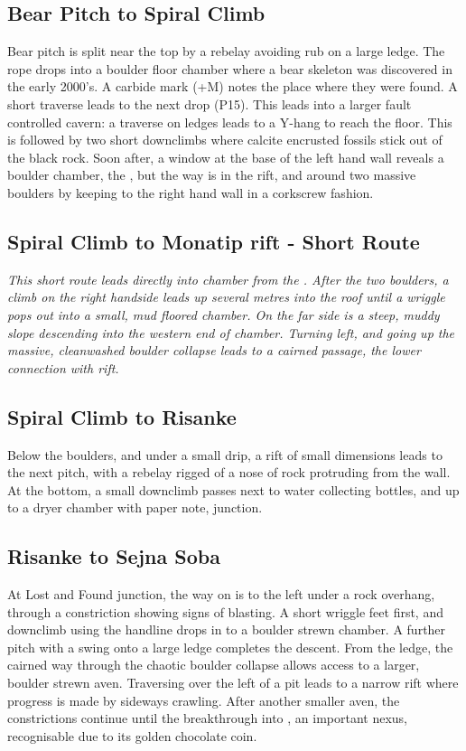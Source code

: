\subsection{Bear Pitch to Spiral Climb}
Bear pitch is split near the top by a rebelay avoiding rub on a large ledge. The rope drops into a boulder floor chamber where a bear skeleton was discovered in the early 2000's. A carbide mark (+M) notes the place where they were found. A short traverse leads to the next drop (P15). This leads into a larger fault controlled cavern: a traverse on ledges leads to a Y-hang to reach the floor. This is followed by two short downclimbs where calcite encrusted fossils stick out of the black rock. Soon after, a window at the base of the left hand wall reveals a boulder chamber, the , but the way is in the rift, and around two massive boulders by keeping to the right hand wall in a corkscrew fashion. 

\subsection{Spiral Climb to Monatip rift - Short Route}
\textit{This short route leads directly into  chamber from the . After the two boulders, a climb on the right handside leads up several metres into the roof until a wriggle pops out into a small, mud floored chamber. On the far side is a steep, muddy slope descending into the western end of  chamber. Turning left, and going up the massive, cleanwashed boulder collapse leads to a cairned passage, the lower connection with  rift.} 

\subsection{Spiral Climb to Risanke}
Below the boulders, and under a small drip, a rift of small dimensions leads to the next pitch, with a rebelay rigged of a nose of rock protruding from the wall. At the bottom, a small downclimb passes next to water collecting bottles, and up to a dryer chamber with paper note,  junction.

\subsection{Risanke to Sejna Soba}
At Lost and Found junction, the way on is to the left under a rock overhang, through a constriction showing signs of blasting. A short wriggle feet first, and downclimb using the handline drops in to a boulder strewn chamber. A further pitch with a swing onto a large ledge completes the descent. From the ledge, the cairned way through the chaotic boulder collapse allows access to a larger, boulder strewn aven. Traversing over the left  of a pit leads to a narrow rift where progress is made by sideways crawling. After another smaller aven, the constrictions continue until the breakthrough into , an important nexus, recognisable due to its golden chocolate coin.

